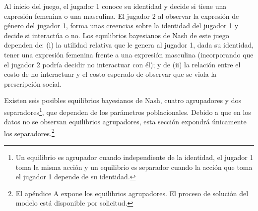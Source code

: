 \begin{figure}[ht!]
	\begin{singlespace}
\end{singlespace}
\end{figure}

Al inicio del juego, el jugador 1 conoce su identidad y decide si tiene una expresión femenina o una masculina. El jugador 2 al observar la expresión de género del jugador 1, forma unas creencias sobre la identidad del jugador 1 y decide si interactúa o no. Los equilibrios bayesianos de Nash de este juego dependen de: (i) la utilidad relativa que le genera al jugador 1, dada su identidad, tener una expresión femenina frente a una expresión masculina (incorporando que el jugador 2 podría decidir no interactuar con él); y de (ii) la relación entre el costo de no interactuar y el costo esperado de observar que se viola la prescripción social. 

Existen seis posibles equilibrios bayesianos de Nash, cuatro agrupadores y dos separadores\footnote{Un equilibrio es agrupador cuando independiente de la identidad, el jugador 1 toma la misma acción y un equilibrio es separador cuando la acción que toma el jugador 1 depende de su identidad.}, que dependen de los parámetros poblacionales. Debido a que en los datos no se observan equilibrios agrupadores, esta sección expondrá únicamente los separadores.\footnote{El apéndice A expone los equilibrios agrupadores. El proceso de solución del modelo está disponible por solicitud.}

